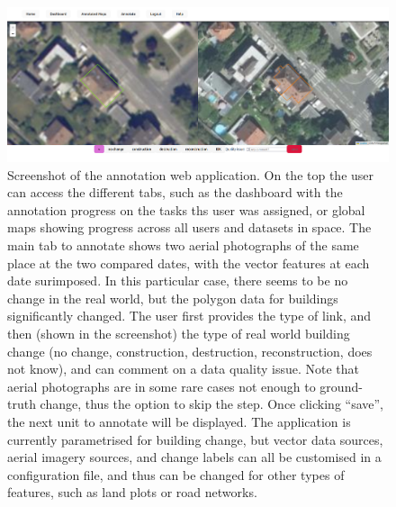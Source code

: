 \documentclass[11pt]{article}
\begin{document}
\newpage


\begin{figure}%
  \centering
  \includegraphics[width=\textwidth]{figures/example_annotate_2025-03-20_22-27-20.png}
  \caption{Screenshot of the annotation web application. On the top the user can access the different tabs, such as the dashboard with the annotation progress on the tasks ths user was assigned, or global maps showing progress across all users and datasets in space. The main tab to annotate shows two aerial photographs of the same place at the two compared dates, with the vector features at each date surimposed. In this particular case, there seems to be no change in the real world, but the polygon data for buildings significantly changed. The user first provides the type of link, and then (shown in the screenshot) the type of real world building change (no change, construction, destruction, reconstruction, does not know), and can comment on a data quality issue. Note that aerial photographs are in some rare cases not enough to ground-truth change, thus the option to skip the step. Once clicking ``save'', the next unit to annotate will be displayed. The application is currently parametrised for building change, but vector data sources, aerial imagery sources, and change labels can all be customised in a configuration file, and thus can be changed for other types of features, such as land plots or road networks.}
\end{figure}

{\small


}
\end{document}
